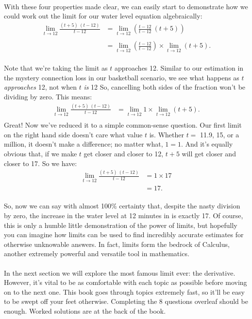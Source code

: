 \documentclass[11pt, leqno]{article}
\numberwithin{equation}{section}
\begin{document}
\\ With these four properties made clear, we can easily start to demonstrate how we could work out the limit for our water level equation algebraically:
\begin{align*}
\lim_{t \to 12} \frac{(t + 5) \ (t - 12)}{t - 12} &= \lim_{t \to 12} \left( \frac{t - 12}{t - 12} \ (t + 5) \right) \\ \\
 &= \lim_{t \to 12} \left(\frac{t - 12}{t - 12}\right) \times \lim_{t \to 12} (t + 5).
\end{align*}
\\ Note that we're taking the limit as \(t\) approaches 12. Similar to our estimation in the mystery connection loss in our basketball scenario, we see what happens as \(t\) \textit{approaches} 12, not when \(t\) \textit{is} 12 So, cancelling both sides of the fraction won't be dividing by zero. This means:
\begin{align*}
\lim_{t \to 12} \frac{(t + 5) \ (t - 12)}{t - 12} &= \lim_{t \to 12} 1 \times \lim_{t \to 12} \left( t + 5 \right). \\
\end{align*}
Great! Now we've reduced it to a simple common-sense question. Our first limit on the right hand side doesn't care what value \(t\) is. Whether \(t = \) 11.9, 15, or a million, it doesn't make a difference; no matter what, \(1 = 1\). And it's equally obvious that, if we make \(t\) get closer and closer to 12, \(t + 5\) will get closer and closer to 17. So we have:
\begin{align*}
\lim_{t \to 12} \frac{(t + 5) \ (t - 12)}{t - 12} &= 1 \times 17 \\
&= 17.
\end{align*}
\\ So, now we can say with almost 100\% certainty that, despite the nasty division by zero, the increase in the water level at 12 minutes in is exactly 17. Of course, this is only a humble little demonstration of the power of limits, but hopefully you can imagine how limits can be used to find incredibly accurate estimates for otherwise unknowable answers. In fact, limits form the bedrock of Calculus, another extremely powerful and versatile tool in mathematics. 
\\ \\ In the next section we will explore the most famous limit ever: the derivative. However, it's vital to be as comfortable with each topic as possible before moving on to the next one. This book goes through topics extremely fast, so it'll be easy to be swept off your feet otherwise. Completing the 8 questions overleaf should be enough. Worked solutions are at the back of the book.
\end{document}
